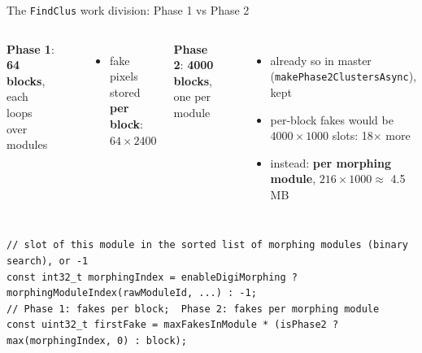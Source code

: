 \documentclass[aspectratio=169,10pt,xcolor=table]{beamer}
\newcommand{\pos}[1]{\textcolor{cbBlue}{#1}}
\newcommand{\con}[1]{\textcolor{cbOrange}{#1}}
\newcommand{\code}[1]{\texttt{\small #1}}
\begin{document}
\begin{frame}[fragile]{The \code{FindClus} work division: Phase 1 vs Phase 2}
  \begin{columns}[T]
    \textbf{Phase 1}: \textbf{64 blocks}, each loops over modules
    \begin{center}
    \end{center}
    \begin{itemize}\small
      \item fake pixels stored \textbf{per block}: $64 \times 2400$
    \end{itemize}
    \textbf{Phase 2}: \textbf{4000 blocks}, one per module
    \begin{center}
    \end{center}
    \begin{itemize}\small
      \item already so in master (\code{makePhase2ClustersAsync}), kept
      \item per-block fakes would be $4000\times1000$ slots: \con{18$\times$ more}
      \item instead: \textbf{per morphing module}, $216 \times 1000 \approx$ \pos{4.5\,MB}
    \end{itemize}
  \end{columns}
\begin{lstlisting}
// slot of this module in the sorted list of morphing modules (binary search), or -1
const int32_t morphingIndex = enableDigiMorphing ? morphingModuleIndex(rawModuleId, ...) : -1;
// Phase 1: fakes per block;  Phase 2: fakes per morphing module
const uint32_t firstFake = maxFakesInModule * (isPhase2 ? max(morphingIndex, 0) : block);
\end{lstlisting}
\end{frame}
\end{document}
